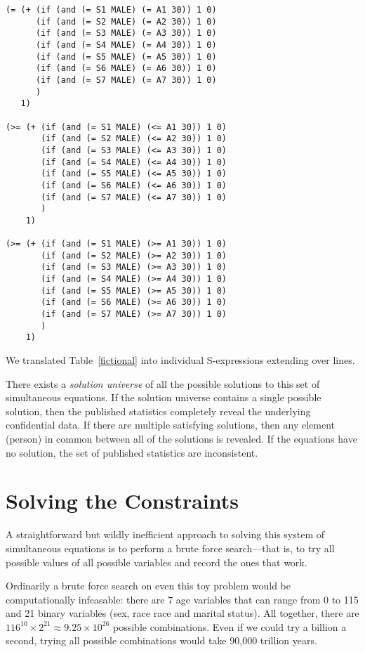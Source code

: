 \documentclass[runningheads]{llncs}
\begin{document}
\begin{Verbatim}
(= (+ (if (and (= S1 MALE) (= A1 30)) 1 0)
      (if (and (= S2 MALE) (= A2 30)) 1 0)      
      (if (and (= S3 MALE) (= A3 30)) 1 0)      
      (if (and (= S4 MALE) (= A4 30)) 1 0)      
      (if (and (= S5 MALE) (= A5 30)) 1 0)      
      (if (and (= S6 MALE) (= A6 30)) 1 0)      
      (if (and (= S7 MALE) (= A7 30)) 1 0)
      )
   1)

(>= (+ (if (and (= S1 MALE) (<= A1 30)) 1 0)
       (if (and (= S2 MALE) (<= A2 30)) 1 0)      
       (if (and (= S3 MALE) (<= A3 30)) 1 0)      
       (if (and (= S4 MALE) (<= A4 30)) 1 0)      
       (if (and (= S5 MALE) (<= A5 30)) 1 0)      
       (if (and (= S6 MALE) (<= A6 30)) 1 0)      
       (if (and (= S7 MALE) (<= A7 30)) 1 0)
       )
    1)

(>= (+ (if (and (= S1 MALE) (>= A1 30)) 1 0)
       (if (and (= S2 MALE) (>= A2 30)) 1 0)      
       (if (and (= S3 MALE) (>= A3 30)) 1 0)      
       (if (and (= S4 MALE) (>= A4 30)) 1 0)      
       (if (and (= S5 MALE) (>= A5 30)) 1 0)      
       (if (and (= S6 MALE) (>= A6 30)) 1 0)      
       (if (and (= S7 MALE) (>= A7 30)) 1 0)
       )
    1)
\end{Verbatim}


We translated Table~\ref{fictional} into \NumSExpressions{} individual
S-expressions extending over \NumConstraintLines{} lines. 

There exists a \textit{solution universe} of all the possible
solutions to this set of simultaneous equations. If the solution
universe contains a single possible solution, then the published
statistics completely reveal the underlying confidential data. If
there are multiple satisfying solutions, then any element (person) in
common between all of the solutions is revealed. If the equations have
no solution, the set of published statistics are inconsistent.

\section{Solving the Constraints}
A straightforward but wildly inefficient approach to solving this
system of simultaneous equations is to perform a brute force
search---that is, to try all possible values of all possible variables
and record the ones that work.

Ordinarily a brute force search on even this toy problem would be
computationally infeasable: there are 7 age variables that can range from 0 to 115
and 21 binary variables (sex, race race and marital status). All
together, there are $116^{10} \times 2^{21} \approx 9.25
\times 10^{26}$ possible combinations. Even if we could try a billion
a second, trying all possible combinations would take 90,000 trillion
years. 
\end{document}
